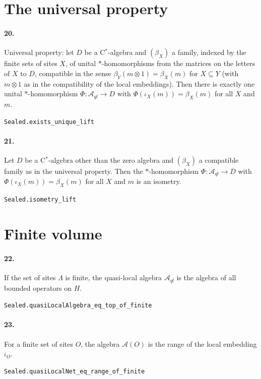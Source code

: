 \documentclass[11pt]{article}
\begin{document}
\section*{The universal property}
\paragraph{20.} Universal property: let $D$ be a C$^*$-algebra and $(\beta_X)$ a family, indexed by the finite sets of sites $X$, of unital $*$-homomorphisms from the matrices on the letters of $X$ to $D$, compatible in the sense $\beta_Y(m \otimes 1) = \beta_X(m)$ for $X \subseteq Y$ (with $m \otimes 1$ as in the compatibility of the local embeddings). Then there is exactly one unital $*$-homomorphism $\Phi : \mathcal A_{ql} \to D$ with $\Phi(\iota_X(m)) = \beta_X(m)$ for all $X$ and $m$.\par{\footnotesize\texttt{Sealed.exists\_unique\_lift}}

\paragraph{21.} Let $D$ be a C$^*$-algebra other than the zero algebra and $(\beta_X)$ a compatible family as in the universal property. Then the $*$-homomorphism $\Phi : \mathcal A_{ql} \to D$ with $\Phi(\iota_X(m)) = \beta_X(m)$ for all $X$ and $m$ is an isometry.\par{\footnotesize\texttt{Sealed.isometry\_lift}}

\section*{Finite volume}
\paragraph{22.} If the set of sites $\Lambda$ is finite, the quasi-local algebra $\mathcal A_{ql}$ is the algebra of all bounded operators on $H$.\par{\footnotesize\texttt{Sealed.quasiLocalAlgebra\_eq\_top\_of\_finite}}

\paragraph{23.} For a finite set of sites $O$, the algebra $\mathcal A(O)$ is the range of the local embedding $\iota_O$.\par{\footnotesize\texttt{Sealed.quasiLocalNet\_eq\_range\_of\_finite}}
\end{document}
